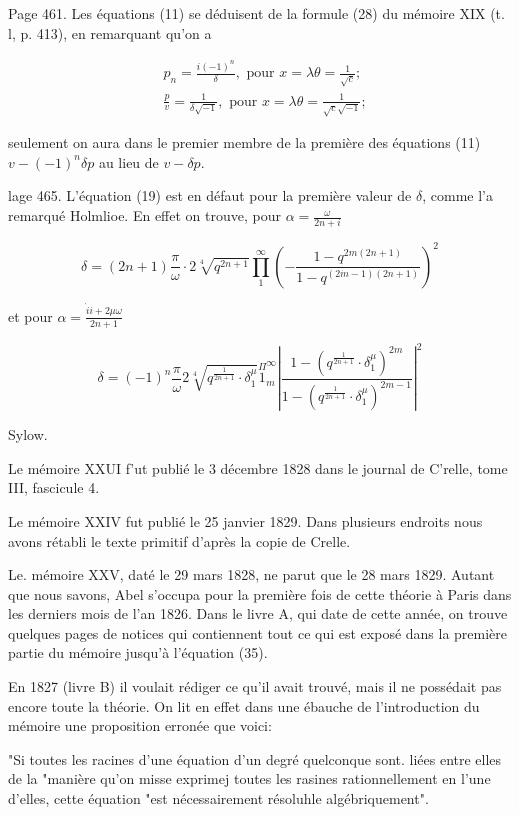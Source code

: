 \documentclass{article}
\begin{document}
Page 461. Les équations (11) se déduisent de la formule (28) du mémoire XIX (t. l, p. 413), en remarquant qu'on a

\[
\begin{aligned}
& p_{n}=\frac{i(-1)^{n}}{\delta}, \text { pour } x=\lambda \theta=\frac{1}{\sqrt{c}} ; \\
& \frac{p}{v}=\frac{1}{\delta \sqrt{-1}}, \text { pour } x=\lambda \theta=\frac{1}{\sqrt{c} \sqrt{-1}} ;
\end{aligned}
\]

seulement on aura dans le premier membre de la première des équations (11) \(v-(-1)^{n} \delta p\) au lieu de \(v-\delta p\).

lage 465. L'équation (19) est en défaut pour la première valeur de \(\delta\), comme l'a remarqué Holmlioe. En effet on trouve, pour \(\alpha=\frac{\omega}{2 n+i}\)

\[
\delta=(2 n+1) \frac{\pi}{\omega} \cdot 2 \sqrt[4]{q^{2 n+1}} \prod_{1}^{\infty}\left(-\frac{1-q^{2 m(2 n+1)}}{1-q^{(2 \dot{m}-1)(2 n+1)}}\right)^{2}
\]

et pour \(\alpha=\frac{\grave{i} i+2 \mu \omega}{2 n+1}\)

\[
\delta=(-1)^{n} \frac{\pi}{\omega} 2 \sqrt[4]{q^{\frac{1}{2 n+1}} \cdot \delta_{1}^{\mu}} \stackrel{\Pi}{1}_{m}^{\infty}\left|\frac{1-\left(q^{\frac{1}{2 n+1}} \cdot \delta_{1}^{\mu}\right)^{2 m}}{1-\left(q^{\frac{1}{2 n+1}} \cdot \delta_{1}^{\mu}\right)^{2 m-1}}\right|^{2}
\]

Sylow.

Le mémoire XXUI f'ut publié le 3 décembre 1828 dans le journal de C'relle, tome III, fascicule 4.

Le mémoire XXIV fut publié le 25 janvier 1829. Dans plusieurs endroits nous avons rétabli le texte primitif d'après la copie de Crelle.

Le. mémoire XXV, daté le 29 mars 1828, ne parut que le 28 mars 1829. Autant que nous savons, Abel s'occupa pour la première fois de cette théorie à Paris dans les derniers mois de l'an 1826. Dans le livre A, qui date de cette année, on trouve quelques pages de notices qui contiennent tout ce qui est exposé dans la première partie du mémoire jusqu'à l'équation (35).

En 1827 (livre B) il voulait rédiger ce qu'il avait trouvé, mais il ne possédait pas encore toute la théorie. On lit en effet dans une ébauche de l'introduction du mémoire une proposition erronée que voici:

"Si toutes les racines d'une équation d'un degré quelconque sont. liées entre elles de la "manière qu'on misse exprimej toutes les rasines rationnellement en l'une d'elles, cette équation "est nécessairement résoluhle algébriquement".
\end{document}
